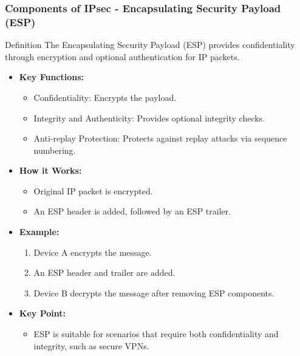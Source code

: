 \documentclass{beamer}
\begin{document}
\begin{frame}[fragile]
    \frametitle{Components of IPsec - Encapsulating Security Payload (ESP)}
    \begin{block}{Definition}
        The Encapsulating Security Payload (ESP) provides confidentiality through encryption and optional authentication for IP packets.
    \end{block}
    \begin{itemize}
        \item \textbf{Key Functions:}
            \begin{itemize}
                \item Confidentiality: Encrypts the payload.
                \item Integrity and Authenticity: Provides optional integrity checks.
                \item Anti-replay Protection: Protects against replay attacks via sequence numbering.
            \end{itemize}
        \item \textbf{How it Works:}
            \begin{itemize}
                \item Original IP packet is encrypted.
                \item An ESP header is added, followed by an ESP trailer.
            \end{itemize}
        \item \textbf{Example:}
            \begin{enumerate}
                \item Device A encrypts the message.
                \item An ESP header and trailer are added.
                \item Device B decrypts the message after removing ESP components.
            \end{enumerate}
        \item \textbf{Key Point:} 
            \begin{itemize}
                \item ESP is suitable for scenarios that require both confidentiality and integrity, such as secure VPNs.
            \end{itemize}
    \end{itemize}
\end{frame}
\end{document}
